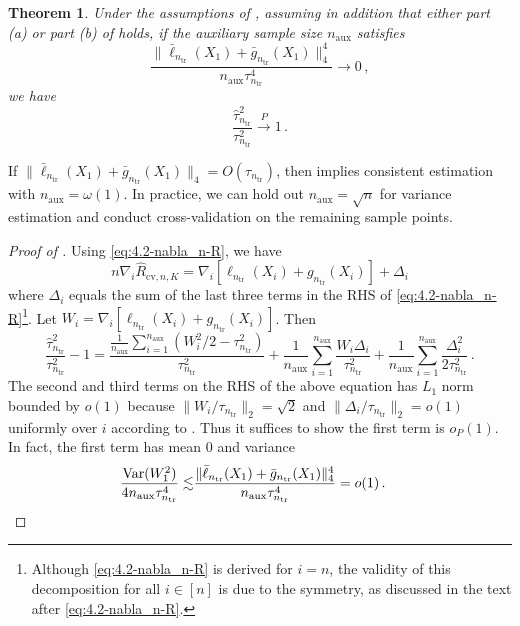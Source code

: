 \documentclass[11pt]{article}
\theoremstyle{plain}
\newtheorem{theorem}{Theorem}[section]
\newcommand{\cv}{{\mathrm{cv}}}
\newcommand{\aux}{{\mathrm{aux}}}
\newcommand{\tr}{{\mathrm{tr}}}
\newcommand{\var}{\mathrm{Var}}
\begin{document}
\begin{theorem}
    \label{thm:4.2-var-est-determ}
    Under the assumptions of , assuming in addition that either part (a) or part (b) of  holds, if the auxiliary sample size $n_\aux$ satisfies
    \begin{equation}\label{eq:4.2-aux-sample-size}
    \frac{\|\bar\ell_{n_\tr}(X_1)+\bar g_{n_\tr}(X_1)\|_4^4}{n_\aux \tau_{n_\tr}^4}\rightarrow 0\,,
    \end{equation} we have
    $$
    \frac{\hat\tau_{n_\tr}^2}{\tau_{n_\tr}^2}\stackrel{P}{\rightarrow} 1\,.
    $$
\end{theorem}
If $\|\bar\ell_{n_\tr}(X_1)+\bar g_{n_\tr}(X_1)\|_4 =  O(\tau_{n_\tr})$, then  implies consistent estimation with $n_\aux=\omega(1)$.   In practice, we can hold out $n_\aux=\sqrt{n}$ for variance estimation and conduct cross-validation on the remaining sample points.

\begin{proof}
    [Proof of ]
Using \eqref{eq:4.2-nabla_n-R}, we have
$$n\nabla_i \hat R_{\cv,n,K}=\nabla_i[\ell_{n_\tr}(X_i)+g_{n_\tr}(X_i)]+\Delta_i$$
where $\Delta_i$ equals the sum of the last three terms in the RHS of \eqref{eq:4.2-nabla_n-R}\footnote{Although \eqref{eq:4.2-nabla_n-R} is derived for $i=n$, the validity of this decomposition for all $i\in[n]$  is due to the symmetry, as discussed in the text after \eqref{eq:4.2-nabla_n-R}.}.
Let $W_i=\nabla_i[\ell_{n_\tr}(X_i)+g_{n_\tr}(X_i)]$. Then
$$\frac{\hat\tau_{n_\tr}^2}{\tau_{n_\tr}^2}-1=\frac{\frac{1}{n_\aux}\sum_{i=1}^{n_\aux} (W_i^2/2-\tau_{n_\tr}^2)}{\tau_{n_\tr}^2}+\frac{1}{n_\aux}\sum_{i=1}^{n_\aux}\frac{W_i \Delta_i}{\tau_{n_\tr}^2}+\frac{1}{n_\aux}\sum_{i=1}^{n_\aux}\frac{\Delta_i^2}{2\tau_{n_\tr}^2}\,.$$
The second and third terms on the RHS of the above equation has $L_1$ norm bounded by $o(1)$ because $\|W_i/\tau_{n_\tr}\|_2 = \sqrt{2}$ and $\|\Delta_i/\tau_{n_\tr}\|_2=o(1)$ uniformly over $i$ according to .  Thus it suffices to show the first term is $o_P(1)$. In fact,
the first term has mean $0$ and variance
\begin{align*}
\frac{\var(W_1^2)}{4n_\aux\tau_{n_\tr}^4}\lesssim & \frac{\|\bar\ell_{n_\tr}(X_1)+\bar g_{n_\tr}(X_1)\|_4^4}{n_\aux\tau_{n_\tr}^4}=o(1)\,.\qedhere
\end{align*}
\end{proof}
\end{document}
